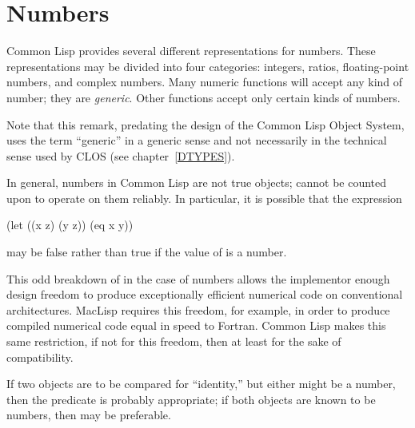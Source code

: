 
\clearpage\def\pagestatus{FINAL PROOF}

\begingroup
\def\arcsinh{\mathop{\rm arcsinh}\nolimits}
\def\arccosh{\mathop{\rm arccosh}\nolimits}
\def\arctanh{\mathop{\rm arctanh}\nolimits}
\def\cis{\mathop{\rm cis}\nolimits}
\def\phase{\mathop{\rm phase}\nolimits}


\chapter{Numbers}
\label{NUMBER}


Common Lisp provides several different representations for numbers.
These representations may be divided into four categories: integers,
ratios, floating-point numbers, and complex numbers.  Many numeric
functions will accept any kind of number; they are {\it generic}.  Other
functions accept only certain kinds of numbers.

\begin{new}
Note that this remark, predating the design of the Common Lisp Object System,
uses the term ``generic'' in a generic sense and not necessarily
in the technical sense used by CLOS
(see chapter~\ref{DTYPES}).
\end{new}



In general, numbers in Common Lisp are not true objects;  cannot
be counted upon to operate on them reliably.  In particular,
it is possible that the expression
\begin{lisp}
(let ((x z) (y z)) (eq x y))
\end{lisp}
may be false rather than true if the value of  is a number.

\beforenoterule
\begin{rationale}
This odd breakdown of  in the case of numbers
allows the implementor enough design freedom to produce exceptionally
efficient numerical code on conventional architectures.
MacLisp requires this freedom, for example, in order to produce compiled
numerical code equal in speed to Fortran.
Common Lisp makes this same restriction,
if not for this freedom, then at least for the sake of compatibility.
\end{rationale}
\afternoterule

If two objects are to be compared for ``identity,'' but either might be
a number, then the predicate  is probably appropriate;
if both objects are known to be numbers, then \cd{=}
may be preferable.

